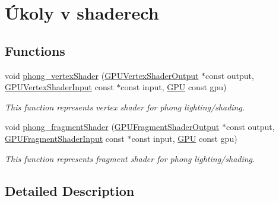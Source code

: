\hypertarget{group__shader__side}{\section{Úkoly v shaderech}
\label{group__shader__side}
}
\subsection*{Functions}
\begin{DoxyCompactItemize}
\item 
void \hyperlink{group__shader__side_gabf238d989258c2c2e8e807e42e1c1404}{phong\-\_\-vertex\-Shader} (\hyperlink{structGPUVertexShaderOutput}{G\-P\-U\-Vertex\-Shader\-Output} $\ast$const output, \hyperlink{structGPUVertexShaderInput}{G\-P\-U\-Vertex\-Shader\-Input} const $\ast$const input, \hyperlink{fwd_8h_a06964ec111fe28721d8618b6d0d993bf}{G\-P\-U} const gpu)
\begin{DoxyCompactList}\small\item\em This function represents vertex shader for phong lighting/shading. \end{DoxyCompactList}\item 
void \hyperlink{group__shader__side_ga9cb61ad448e54a23ba4d01a6ebdb48eb}{phong\-\_\-fragment\-Shader} (\hyperlink{structGPUFragmentShaderOutput}{G\-P\-U\-Fragment\-Shader\-Output} $\ast$const output, \hyperlink{structGPUFragmentShaderInput}{G\-P\-U\-Fragment\-Shader\-Input} const $\ast$const input, \hyperlink{fwd_8h_a06964ec111fe28721d8618b6d0d993bf}{G\-P\-U} const gpu)
\begin{DoxyCompactList}\small\item\em This function represents fragment shader for phong lighting/shading. \end{DoxyCompactList}\end{DoxyCompactItemize}


\subsection{Detailed Description}



